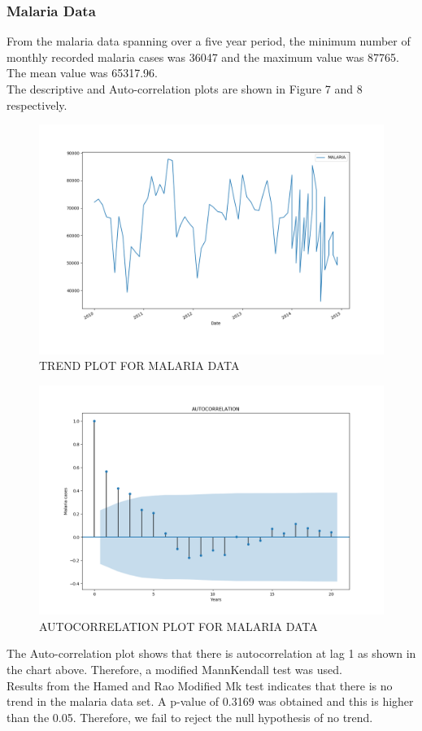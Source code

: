 \documentclass[12pt, letterpaper, twoside]{article}
\begin{document}
\subsubsection{Malaria Data}
From the malaria data spanning over a five year period, the minimum number of monthly recorded malaria cases was 36047 and the maximum value was 87765. The mean value was 65317.96. \\ The descriptive and Auto-correlation plots are shown in Figure 7 and 8 respectively. 
\begin{figure}[bp!]
	    \centering
		\includegraphics[width=1\textwidth]{Malaria_Trend_plot.png}
		    \caption{TREND PLOT FOR MALARIA DATA}
		        \label{fig:3.1}
\end{figure}

\begin{figure}[bp!]
	    \centering                                                                                                                                                                  \includegraphics[width=1\textwidth]{MALARIA_DATA_ACF_PLOT.png}
		    \caption{AUTOCORRELATION PLOT FOR MALARIA DATA}
		       \label{fig:3.2}
\end{figure}
The Auto-correlation plot shows that there is autocorrelation at lag 1 as shown in the chart above. Therefore, a modified MannKendall test was used.\\   
Results from the Hamed and Rao Modified Mk test indicates that there is no trend in the malaria data set. A p-value of 0.3169 was obtained and this is higher than the 0.05. Therefore, we fail to reject the null hypothesis of no trend. 
\end{document}
